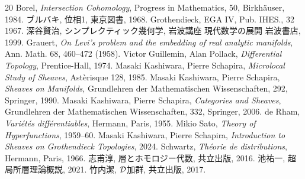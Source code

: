 \begin{thebibliography}{20} 
     Borel, 
        \textit{Intersection Cohomology}, 
        Progress in Mathematics, 50, Birkh\"auser, 1984.
     ブルバキ, 位相1, 東京図書, 1968.
     Grothendieck, EGA IV, Pub. IHES., 32 1967.
     深谷賢治, シンプレクティック幾何学, 岩波講座 現代数学の展開 岩波書店, 1999.
     Grauert, 
        \textit{On Levi's problem and the embedding of real analytic manifolds}, 
        Ann. Math. 68, 460--472 (1958).
     Victor Guillemin, Alan Pollack, 
        \textit{Differential Topology}, 
        Prentice-Hall, 1974.
     Masaki Kashiwara, Pierre Schapira, 
        \textit{Microlocal Study of Sheaves}, 
        Ast\`erisque 128, 1985.
     Masaki Kashiwara, Pierre Schapira, 
        \textit{Sheaves on Manifolds}, 
        Grundlehren der Mathematischen Wissenschaften, 292, Springer, 1990.
     Masaki Kashiwara, Pierre Schapira, 
        \textit{Categories and Sheaves}, 
        Grundlehren der Mathematischen Wissenschaften, 332, Springer, 2006.
     de Rham, 
        \textit{Vari\'et\'es diff\'erentiables}, 
        Hermann, Paris, 1955.
     Mikio Sato, 
        \textit{Theory of Hyperfunctions}, 
        1959--60.
     Masaki Kashiwara, Pierre Schapira, 
        \textit{Introduction to Sheaves on Grothendieck Topologies}, 
        2024.
     Schwartz, 
        \textit{Th\'eorie de distributions}, 
        Hermann, Paris, 1966.
     志甫淳, 層とホモロジー代数, 共立出版, 2016.
     池祐一, 超局所層理論概説, 2021.
     竹内潔, \(\mathcal{D}\)加群, 共立出版, 2017.
\end{thebibliography}




